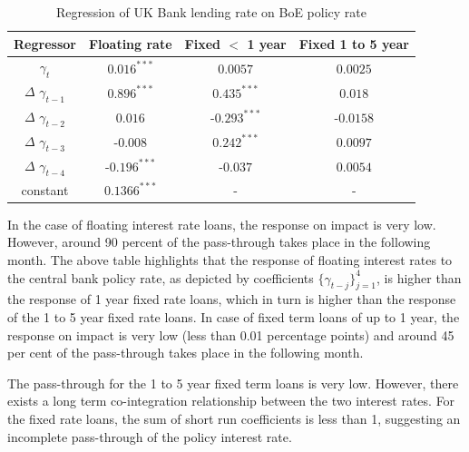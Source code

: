 \documentclass[12pt]{article}
\numberwithin{equation}{section}
\begin{document}
\begin {table}[H]
\caption {Regression of UK Bank lending rate on BoE policy rate} \label{tab:title} 
\begin{center}
	\begin{tabular}{||c c c c  ||} 
		\hline
		Regressor & Floating rate & Fixed $<$ 1 year& Fixed 1 to 5 year \\ [0.5ex] 
		\hline\hline
		$\gamma_{t}$ & $0.016^{***}$ & $0.0057$& $0.0025$ \\ 
		\hline
		$\Delta$ $\gamma_{t-1}$& $0.896^{***}$ & $0.435^{***}$& $0.018$  \\ 
		\hline
		 $\Delta$ $\gamma_{t-2}$&$0.016$ & -$0.293^{***}$& -$0.0158$\\
		
		\hline
	$\Delta$ $\gamma_{t-3}$	&  -$0.008$ & $0.242^{***}$& $0.0097$ \\
		\hline
		$\Delta$  $\gamma_{t-4}$&-$0.196^{***}$ &-$0.037$& $0.0054$ \\  
		\hline
		constant&$0.1366^{***}$ & - & -\\ 
			
			\hline
		
		\hline
		
	\end{tabular}

\end{center}

\end {table}



In the case of floating interest rate loans, the response on impact is very low. However, around 90 percent of the pass-through takes place in the following month. The above table highlights that the response of floating interest rates to the central bank policy rate, as depicted by coefficients $\{ \gamma_{t-j} \}_{j=1}^{4}  $,  is higher than the response of 1 year fixed rate loans, which in turn is higher than the response of the 1 to 5 year fixed rate loans.  In case of fixed term loans of up to 1 year, the response on impact is very low (less than 0.01 percentage points) and around 45 per cent of the pass-through takes place in the following month. 


The pass-through for the 1 to 5 year fixed term loans is very low. However, there exists a long term co-integration relationship between the two interest rates. For the fixed rate loans, the sum of short run coefficients is less than 1, suggesting an incomplete pass-through of the policy interest rate.
\end{document}
